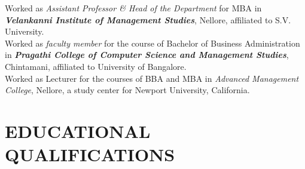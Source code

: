 \documentclass[10pt]{article}
\begin{document}
 Worked as \textit{Assistant Professor \& Head of the Department} for MBA in \emph{\textbf{Velankanni Institute of Management Studies}}, Nellore, affiliated to S.V. University. \\

 Worked as \textit{faculty member} for the course of Bachelor of Business Administration in \emph{\textbf{Pragathi College of Computer Science and Management Studies}}, Chintamani, affiliated to University of Bangalore. \\

 Worked as Lecturer for the courses of BBA and MBA in \emph{Advanced Management College}, Nellore,  a study center for Newport University, California. \\ 


\section{EDUCATIONAL QUALIFICATIONS} \hline \vspace{0.5cm}
\end{document}
